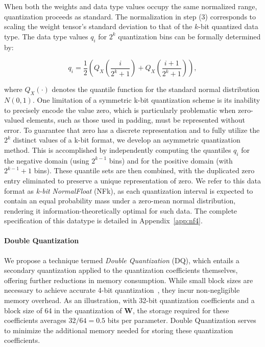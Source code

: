 When both the weights and data type values occupy the same normalized range, quantization proceeds as standard. The normalization in step (3) corresponds to scaling the weight tensor's standard deviation to that of the $k$-bit quantized data type. The data type values $q_i$ for $2^k$ quantization bins can be formally determined by:

\begin{equation}
q_i  = \frac{1}{2}\left( Q_X\left(\frac{i}{2^k+1}\right) + Q_X\left(\frac{i+1}{2^k+1}\right)\right),
\end{equation}

where $Q_X(\cdot)$ denotes the quantile function for the standard normal distribution $N(0,1)$. One limitation of a symmetric k-bit quantization scheme is its inability to precisely encode the value zero, which is particularly problematic when zero-valued elements, such as those used in padding, must be represented without error. To guarantee that zero has a discrete representation and to fully utilize the $2^k$ distinct values of a k-bit format, we develop an asymmetric quantization method. This is accomplished by independently computing the quantiles $q_i$ for the negative domain (using $2^{k-1}$ bins) and for the positive domain (with $2^{k-1}+1$ bins). These quantile sets are then combined, with the duplicated zero entry eliminated to preserve a unique representation of zero. We refer to this data format as \emph{k-bit NormalFloat} (NFk), as each quantization interval is expected to contain an equal probability mass under a zero-mean normal distribution, rendering it information-theoretically optimal for such data. The complete specification of this datatype is detailed in Appendix~\ref{app:nf4}.

\paragraph{Double Quantization{}} 
We propose a technique termed \emph{Double Quantization} (DQ), which entails a secondary quantization applied to the quantization coefficients themselves, offering further reductions in memory consumption. While small block sizes are necessary to achieve accurate 4-bit quantization~\citep{dettmers2022case}, they incur non-negligible memory overhead. As an illustration, with 32-bit quantization coefficients and a block size of 64 in the quantization of $\mathbf{W}$, the storage required for these coefficients averages $32/64 = 0.5$ bits per parameter. Double Quantization serves to minimize the additional memory needed for storing these quantization coefficients.

